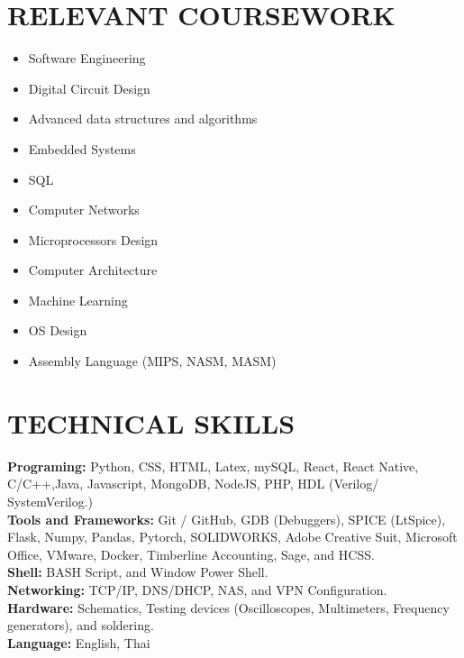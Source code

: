 \documentclass[letterpaper,11pt]{article}
\newcommand{\resumeSubHeadingListStart}{\begin{itemize}[leftmargin=0.0in, label={}]}
\newcommand{\resumeSubHeadingListEnd}{\end{itemize}}
\begin{document}
\section{RELEVANT COURSEWORK}
    \begin{multicols}{4}
        \begin{itemize}[itemsep=-1pt, parsep=3pt]
            \item \small Software Engineering
            \item \small Digital Circuit Design 
            \item \small Advanced data structures and algorithms
            \item \small Embedded Systems
            \item \small SQL 
            \item \small Computer Networks
            \item \small Microprocessors Design
            \item \small Computer Architecture
            \item \small Machine Learning
            \item \small OS Design
            \item \small Assembly Language (MIPS, NASM, MASM)
        \end{itemize}
    \end{multicols}
    \vspace*{1.5\multicolsep}
\vspace{-1pt}

\section{TECHNICAL SKILLS}
\begin{itemize}[left=0.15in, label={}]
    \small{
    \item \textbf{Programing:} Python, CSS, HTML, Latex, mySQL, React, React Native, C/C++,Java, Javascript, MongoDB, NodeJS, PHP, 
    HDL (Verilog/ SystemVerilog.) \\
    \textbf{Tools and Frameworks:} Git / GitHub, GDB (Debuggers), SPICE (LtSpice), Flask, Numpy, Pandas, Pytorch, SOLIDWORKS, Adobe Creative Suit, Microsoft Office, VMware, Docker, Timberline Accounting, Sage, and HCSS. \\
    \textbf{Shell:} BASH Script, and Window Power Shell. \\
    \textbf{Networking:} TCP/IP, DNS/DHCP, NAS, and VPN Configuration. \\
    \textbf{Hardware:} Schematics, Testing devices (Oscilloscopes, Multimeters, Frequency generators), and soldering. \\
    \textbf{Language:} English, Thai \\
    }
\end{itemize}
\vspace{-15pt}
\end{document}
